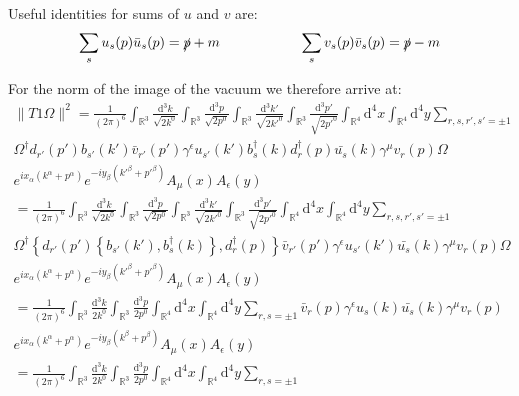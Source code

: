 \documentclass[a4paper,12pt]{article}
\begin{document}
Useful identities for sums of \(u\) and \(v\) are:
\begin{equation}
\sum_s u_s(p)\bar{u}_s(p)=\slashed{p}+m \hspace{2cm} \sum_s v_s(p)\bar{v}_s(p)=\slashed{p}-m
\end{equation}

For the norm of the image of the vacuum we therefore arrive at:
\begin{multline}
\| T1 \Omega\|^2= \frac{1}{(2\pi)^6}  \int_{\mathbb{R}^3} \frac{\text{d}^3k}{\sqrt{2 k^0}} \int_{\mathbb{R}^3} \frac{\text{d}^3p}{\sqrt{2 p^0}} 
 \int_{\mathbb{R}^3} \frac{\text{d}^3k'}{\sqrt{2 k'^0}} \int_{\mathbb{R}^3} \frac{\text{d}^3p'}{\sqrt{2 p'^0}} \int_{\mathbb{R}^4}\text{d}^4x \int_{\mathbb{R}^4}\text{d}^4y
\sum_{r,s,r',s' = \pm1} \\
\Omega^\dagger 
 d_{r'} (p') b_{s'} (k')  \bar{v}_{r'} (p') \gamma^\epsilon u_{s'}(k') 
 b^\dagger_s (k) d^\dagger_r (p) \bar{u_s}(k) \gamma^\mu v_r (p) 
\Omega  \\
 e^{i x_\alpha (k^\alpha + p^\alpha)} e^{-i y_\beta (k'^\beta + p'^\beta)} 
 A_{\mu} (x) A_{\epsilon} (y)  \\
 =\frac{1}{(2\pi)^6} \int_{\mathbb{R}^3} \frac{\text{d}^3k}{\sqrt{2 k^0}} \int_{\mathbb{R}^3} \frac{\text{d}^3p}{\sqrt{2 p^0}} 
 \int_{\mathbb{R}^3} \frac{\text{d}^3k'}{\sqrt{2 k'^0}} \int_{\mathbb{R}^3} \frac{\text{d}^3p'}{\sqrt{2 p'^0}} \int_{\mathbb{R}^4}\text{d}^4x \int_{\mathbb{R}^4}\text{d}^4y
\sum_{r,s,r',s' = \pm1} \\
\Omega^\dagger 
\left\{ d_{r'} (p') \left\{b_{s'} (k'), b^\dagger_s (k)\right\}, d^\dagger_r (p)\right\} \bar{v}_{r'} (p') \gamma^\epsilon u_{s'}(k') 
  \bar{u_s}(k) \gamma^\mu v_r (p) 
\Omega  \\
 e^{i x_\alpha (k^\alpha + p^\alpha)} e^{-i y_\beta (k'^\beta + p'^\beta)} 
 A_{\mu} (x) A_{\epsilon} (y)  \\
 =\frac{1}{(2\pi)^6}  \int_{\mathbb{R}^3} \frac{\text{d}^3k}{2 k^0} \int_{\mathbb{R}^3} \frac{\text{d}^3p}{2 p^0} \int_{\mathbb{R}^4}\text{d}^4x\int_{\mathbb{R}^4}\text{d}^4y
 \sum_{r,s = \pm1} 
 \bar{v}_{r} (p) \gamma^\epsilon u_{s}(k) 
  \bar{u_s}(k) \gamma^\mu v_r (p)  \\
 e^{i x_\alpha (k^\alpha + p^\alpha)} e^{-i y_\beta (k^\beta + p^\beta)} 
 A_{\mu} (x) A_{\epsilon} (y)  \\
  =\frac{1}{(2\pi)^6} \int_{\mathbb{R}^3} \frac{\text{d}^3k}{2 k^0} \int_{\mathbb{R}^3} \frac{\text{d}^3p}{2 p^0} \int_{\mathbb{R}^4}\text{d}^4x\int_{\mathbb{R}^4}\text{d}^4y 
 \sum_{r,s = \pm1} 

\end{multline}
\end{document}

